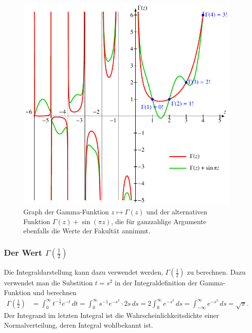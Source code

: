 \begin{figure}
\centering
\includegraphics{chapters/040-rekursion/images/gammaplot.pdf}
\caption{Graph der Gamma-Funktion $z\mapsto\Gamma(z)$ und der alternativen
Funktion $\Gamma(z)+\sin(\pi z)$, die für ganzzahlige Argumente ebenfalls
die Werte der Fakultät annimmt.
\label{buch:rekursion:fig:gamma}}
\end{figure}

%
%
\subsubsection{Der Wert $\Gamma(\frac12)$}
Die Integraldarstellung kann dazu verwendet werden, $\Gamma(\frac12)$ 
zu berechnen.
%
%
Dazu verwendet man die Substition $t=s^2$ in der Integraldefinition
der Gamma-Funktion und berechnen
\begin{align}
\Gamma({\textstyle\frac12})
&=
\int_0^\infty t^{-\frac12} e^{-t}\,dt
=
\int_0^\infty s^{-1} e^{-s^2}\cdot 2s\,ds
=
2\int_0^\infty e^{-s^2}\,ds
=
\int_{-\infty}^\infty e^{-s^2}\,ds
=
\sqrt{\pi}.
\label{buch:rekursion:gamma:wert12}
\end{align}
Der Integrand im letzten Integral ist die Wahrscheinlichkeitsdichte
einer Normalverteilung, deren Integral wohlbekannt ist.

